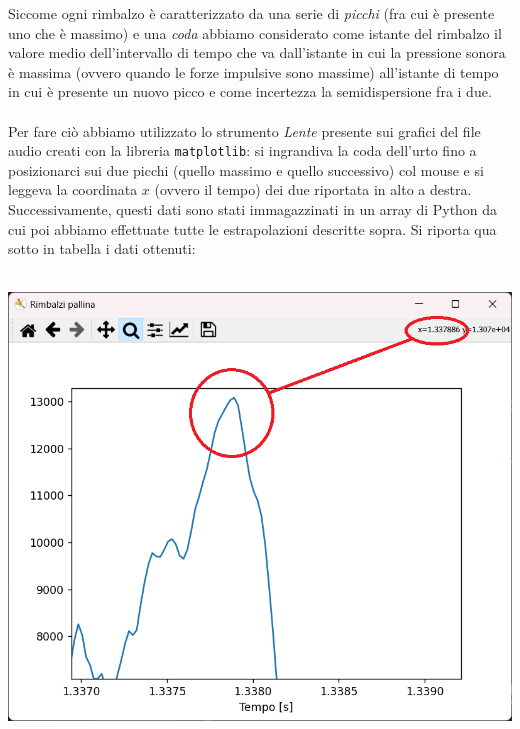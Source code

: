 \documentclass{article}
\begin{document}
Siccome ogni rimbalzo è caratterizzato da una serie di \emph{picchi} (fra cui è presente uno che è massimo) e una \emph{coda} abbiamo considerato come istante del rimbalzo il valore medio dell'intervallo di tempo che va dall'istante in cui la pressione sonora è massima (ovvero quando le forze impulsive sono massime) all'istante di tempo  in cui è presente un nuovo picco e come incertezza la semidispersione fra i due. \\ \\
Per fare ciò abbiamo utilizzato lo strumento \emph{Lente} presente sui grafici del file audio creati con la libreria \texttt{matplotlib}: si ingrandiva la coda dell'urto fino a posizionarci sui due picchi (quello massimo e quello successivo) col mouse e si leggeva la coordinata $x$ (ovvero il tempo) dei due riportata in alto a destra.
\noindent Successivamente, questi dati sono stati immagazzinati in un array di Python da cui poi abbiamo effettuate tutte le estrapolazioni descritte sopra. Si riporta qua sotto in tabella i dati ottenuti: \\ \\
\hspace{-0.05\textwidth} \begin{minipage}{0.5\textwidth}
	\centering
	\includegraphics[scale=0.40]{Esempio_misurazione.png}
\end{minipage}
\end{document}

